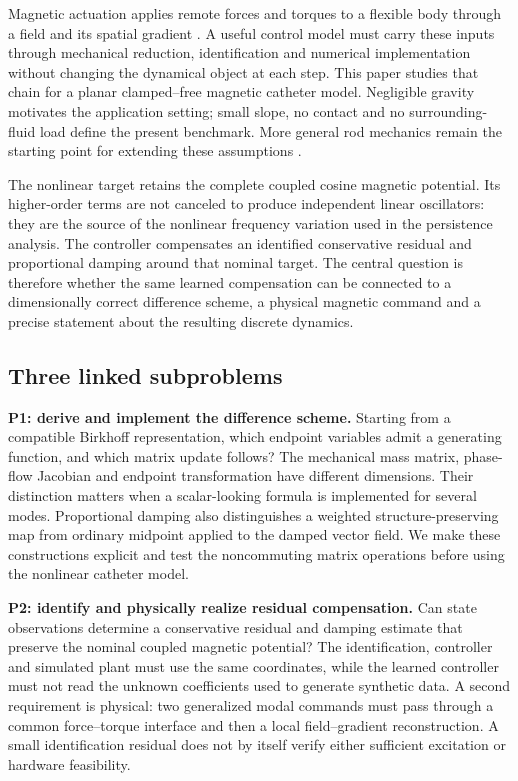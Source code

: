 Magnetic actuation applies remote forces and torques to a flexible body through a field and its spatial gradient \citep{abbott,kim}. A useful control model must carry these inputs through mechanical reduction, identification and numerical implementation without changing the dynamical object at each step. This paper studies that chain for a planar clamped--free magnetic catheter model. Negligible gravity motivates the application setting; small slope, no contact and no surrounding-fluid load define the present benchmark. More general rod mechanics remain the starting point for extending these assumptions \citep{simo,antman}.

The nonlinear target retains the complete coupled cosine magnetic potential. Its higher-order terms are not canceled to produce independent linear oscillators: they are the source of the nonlinear frequency variation used in the persistence analysis. The controller compensates an identified conservative residual and proportional damping around that nominal target. The central question is therefore whether the same learned compensation can be connected to a dimensionally correct difference scheme, a physical magnetic command and a precise statement about the resulting discrete dynamics.

\subsection{Three linked subproblems}
\label{fw:three-questions}
\textbf{P1: derive and implement the difference scheme.} Starting from a compatible Birkhoff representation, which endpoint variables admit a generating function, and which matrix update follows? The mechanical mass matrix, phase-flow Jacobian and endpoint transformation have different dimensions. Their distinction matters when a scalar-looking formula is implemented for several modes. Proportional damping also distinguishes a weighted structure-preserving map from ordinary midpoint applied to the damped vector field. We make these constructions explicit and test the noncommuting matrix operations before using the nonlinear catheter model.

\textbf{P2: identify and physically realize residual compensation.} Can state observations determine a conservative residual and damping estimate that preserve the nominal coupled magnetic potential? The identification, controller and simulated plant must use the same coordinates, while the learned controller must not read the unknown coefficients used to generate synthetic data. A second requirement is physical: two generalized modal commands must pass through a common force--torque interface and then a local field--gradient reconstruction. A small identification residual does not by itself verify either sufficient excitation or hardware feasibility.

